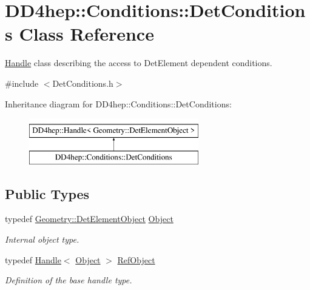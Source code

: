 \hypertarget{class_d_d4hep_1_1_conditions_1_1_det_conditions}{}\section{D\+D4hep\+:\+:Conditions\+:\+:Det\+Conditions Class Reference}
\label{class_d_d4hep_1_1_conditions_1_1_det_conditions}


\hyperlink{class_d_d4hep_1_1_handle}{Handle} class describing the access to Det\+Element dependent conditions.  




{\ttfamily \#include $<$Det\+Conditions.\+h$>$}

Inheritance diagram for D\+D4hep\+:\+:Conditions\+:\+:Det\+Conditions\+:\begin{figure}[H]
\begin{center}
\leavevmode
\includegraphics[height=2.000000cm]{class_d_d4hep_1_1_conditions_1_1_det_conditions}
\end{center}
\end{figure}
\subsection*{Public Types}
\begin{DoxyCompactItemize}
\item 
typedef \hyperlink{class_d_d4hep_1_1_geometry_1_1_det_element_object}{Geometry\+::\+Det\+Element\+Object} \hyperlink{class_d_d4hep_1_1_conditions_1_1_det_conditions_a4c0ad456b1967b5b724894f23ef63dec}{Object}
\begin{DoxyCompactList}\small\item\em Internal object type. \end{DoxyCompactList}\item 
typedef \hyperlink{class_d_d4hep_1_1_handle}{Handle}$<$ \hyperlink{class_d_d4hep_1_1_conditions_1_1_det_conditions_a4c0ad456b1967b5b724894f23ef63dec}{Object} $>$ \hyperlink{class_d_d4hep_1_1_conditions_1_1_det_conditions_ab958ffc02b500f3404f001bec0eca780}{Ref\+Object}
\begin{DoxyCompactList}\small\item\em Definition of the base handle type. \end{DoxyCompactList}\end{DoxyCompactItemize}
